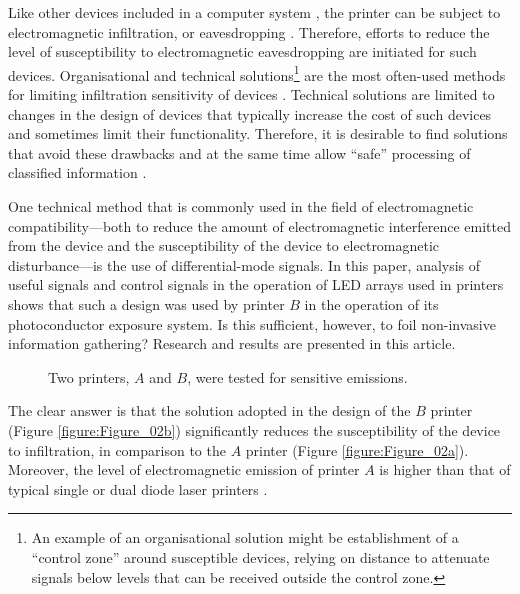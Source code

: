 \documentclass[12pt,a4paper]{article}
\begin{document}
Like other devices included in a computer system \cite{Kuhn2002,Kubiak2016a},
the printer can be subject to electromagnetic infiltration, or eavesdropping
\cite{Ketenci2015a,Kubiak2016b}. Therefore, efforts to reduce the level of
susceptibility to electromagnetic eavesdropping are initiated for such
devices. Organisational and technical solutions\footnote{An example of an
organisational solution might be establishment of a ``control zone'' around
susceptible devices, relying on distance to attenuate signals below levels
that can be received outside the control zone.} are the most often-used
methods for limiting infiltration sensitivity of devices \cite{Kubiak2006a}.
Technical solutions are limited to changes in the
design of devices that typically increase the cost of such devices and
sometimes limit their functionality. Therefore, it is desirable to find
solutions that avoid these drawbacks and at the same time allow ``safe''
processing of classified information \cite{Wasfy2011a,Goel2012a}.

One technical method that is commonly used in the field of electromagnetic
compatibility---both to reduce the amount of electromagnetic interference
emitted from the device and the susceptibility of the device to
electromagnetic disturbance---is the use of differential-mode signals.
In this paper, analysis of useful signals and control signals
\cite{Kubiak2017d} in the operation of LED arrays
used in printers shows that such a design was used by printer $B$ in the
operation of its photoconductor exposure system. Is this sufficient, however,
to foil non-invasive information gathering? Research and results are
presented in this article.

\begin{figure*}[ht]
    \centering
    \hfil
    \caption{Two printers, $A$ and $B$, were tested for sensitive emissions.}
    \label{figure:Figure_02}
\end{figure*}

The clear answer is that the solution adopted in the design of the $B$
printer (Figure \ref{figure:Figure_02b}) significantly reduces the
susceptibility of the device to infiltration, in comparison to the $A$
printer (Figure \ref{figure:Figure_02a}). Moreover, the level of
electromagnetic emission of printer $A$ is higher than that of
typical single or dual diode laser printers \cite{Kubiak2014b}.
\end{document}
